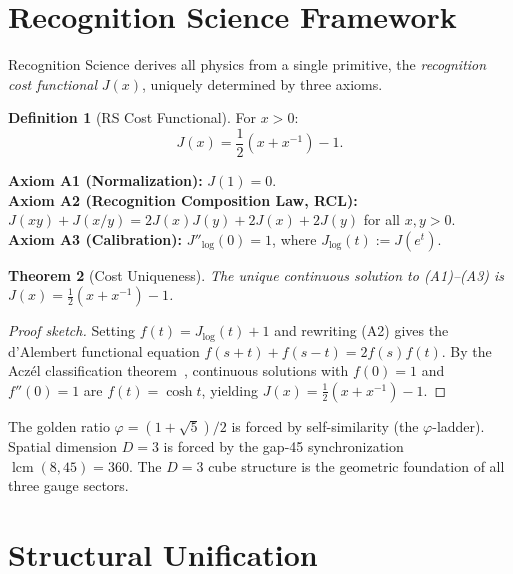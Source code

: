 \documentclass[12pt,a4paper]{article}
\newtheorem{theorem}{Theorem}[section]
\theoremstyle{definition}
\newtheorem{definition}[theorem]{Definition}
\theoremstyle{remark}
\begin{document}
\section{Recognition Science Framework}
\label{sec:framework}

Recognition Science derives all physics from a single primitive,
the \emph{recognition cost functional} $J(x)$, uniquely determined
by three axioms.

\begin{definition}[RS Cost Functional]
For $x > 0$:
\begin{equation}
  J(x) = \frac{1}{2}\!\left(x + x^{-1}\right) - 1.
\end{equation}
\end{definition}

\noindent\textbf{Axiom A1 (Normalization):} $J(1) = 0$.\\
\textbf{Axiom A2 (Recognition Composition Law, RCL):}
$J(xy) + J(x/y) = 2J(x)J(y) + 2J(x) + 2J(y)$ for all $x, y > 0$.\\
\textbf{Axiom A3 (Calibration):} $J''_{\log}(0) = 1$, where
$J_{\log}(t) := J(e^t)$.

\begin{theorem}[Cost Uniqueness]
\label{thm:unique}
The unique continuous solution to \textup{(A1)--(A3)} is
$J(x) = \tfrac{1}{2}(x + x^{-1}) - 1$.
\end{theorem}

\begin{proof}[Proof sketch]
Setting $f(t) = J_{\log}(t) + 1$ and rewriting \textup{(A2)} gives
the d'Alembert functional equation $f(s+t) + f(s-t) = 2f(s)f(t)$.
By the Acz\'el classification theorem~\cite{Aczel1966}, continuous
solutions with $f(0) = 1$ and $f''(0) = 1$ are $f(t) = \cosh t$,
yielding $J(x) = \tfrac{1}{2}(x + x^{-1}) - 1$.
\end{proof}

\noindent The golden ratio $\varphi = (1+\sqrt{5})/2$ is forced by
self-similarity (the $\varphi$-ladder).  Spatial dimension $D = 3$
is forced by the gap-45 synchronization $\operatorname{lcm}(8, 45)
= 360$.  The $D = 3$ cube structure is the geometric foundation of
all three gauge sectors.

\section{Structural Unification}
\label{sec:structural}
\end{document}
